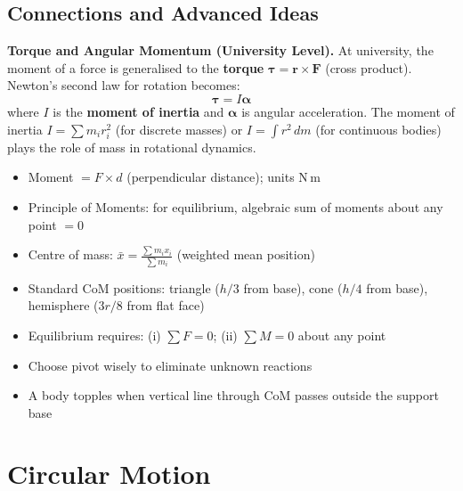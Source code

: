 \documentclass[12pt, a4paper]{book}
\newcommand{\Fvec}{\mathbf{F}}
\newcommand{\rvec}{\mathbf{r}}
\begin{document}
\section{Connections and Advanced Ideas}

\begin{explorationbox}
\textbf{Torque and Angular Momentum (University Level).}
At university, the moment of a force is generalised to the \textbf{torque} $\boldsymbol{\tau} = \rvec \times \Fvec$ (cross product). Newton's second law for rotation becomes:
\[
  \boldsymbol{\tau} = I\boldsymbol{\alpha}
\]
where $I$ is the \textbf{moment of inertia} and $\boldsymbol{\alpha}$ is angular acceleration. The moment of inertia $I = \sum m_i r_i^2$ (for discrete masses) or $I = \int r^2\,dm$ (for continuous bodies) plays the role of mass in rotational dynamics.
\end{explorationbox}

\begin{summarybox}
\begin{itemize}[leftmargin=1.5em]
  \item Moment $= F \times d$ (perpendicular distance); units N\,m
  \item Principle of Moments: for equilibrium, algebraic sum of moments about any point $= 0$
  \item Centre of mass: $\bar{x} = \frac{\sum m_i x_i}{\sum m_i}$ (weighted mean position)
  \item Standard CoM positions: triangle ($h/3$ from base), cone ($h/4$ from base), hemisphere ($3r/8$ from flat face)
  \item Equilibrium requires: (i) $\sum F = 0$; (ii) $\sum M = 0$ about any point
  \item Choose pivot wisely to eliminate unknown reactions
  \item A body topples when vertical line through CoM passes outside the support base
\end{itemize}
\end{summarybox}

\chapter{Circular Motion}
\end{document}
